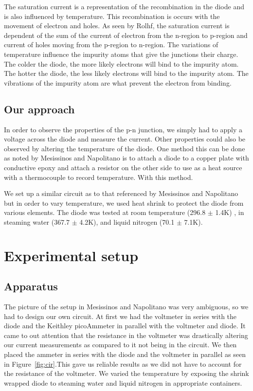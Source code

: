 \documentclass[11pt,letterpaper,onecolumn]{article}
\begin{document}
The saturation current is a representation of the recombination in the diode and is also influenced by temperature.  This recombination is occurs with the movement of electron and holes. As seen by Rolhf, the saturation current is dependent of the sum of the current of electron from the n-region to p-region and current of holes moving from the p-region to n-region. The variations of temperature influence the impurity atoms that give the junctions their charge. The colder the diode, the more likely electrons will bind to the impurity atom. The hotter the diode, the less likely electrons will bind to the impurity atom. The vibrations of the impurity atom are what prevent the electron from binding.~\cite{Hons,Roh,Shock}  

\subsection{Our approach}

In order to observe the properties of the p-n junction, we simply had to apply a voltage across the diode and measure the current. Other properties could also be observed by altering the temperature of the diode. One method this can be done as noted by Mesissinos and Napolitano is to attach a diode to a copper plate with conductive epoxy and attach a resistor on the other side to use as a heat source with a thermocouple to record temperature. With this method.~\cite{EMP}

We set up a similar circuit as to that referenced by Mesissinos and Napolitano but in order to vary temperature, we used heat shrink to protect the diode from various elements. The diode was tested at room temperature (296.8 $\pm$ 1.4K) , in steaming water (367.7 $\pm$ 4.2K), and liquid nitrogen (70.1 $\pm$ 7.1K).


\section{Experimental setup}

\subsection{Apparatus}

The picture of the setup in Mesissinos and Napolitano was very ambiguous, so we had to design our own circuit. At first we had the voltmeter in series with the diode and the Keithley picoAmmeter in parallel with the voltmeter and diode. It came to out attention that the resistance in the voltmeter was drastically altering our current measurements as compared to it not being in the circuit. We then placed the ammeter in series with the diode and the voltmeter in parallel as seen in Figure~\ref{fig:cir}.This gave us reliable results as we did not have to account for the resistance of the voltmeter. We varied the temperature by exposing the shrink wrapped diode to steaming water and liquid nitrogen in appropriate containers. 
\end{document}
